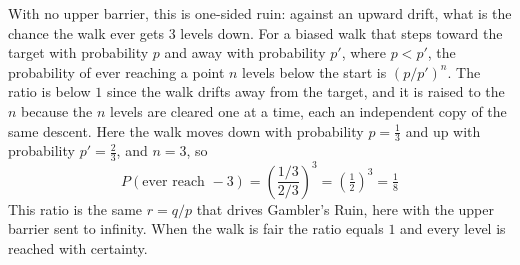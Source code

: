 \begin{solution}
With no upper barrier, this is one-sided ruin: against an upward drift, what is the chance the walk ever gets $3$ levels down. For a biased walk that steps toward the target with probability $p$ and away with probability $p'$, where $p < p'$, the probability of ever reaching a point $n$ levels below the start is $\left(p/p'\right)^n$. The ratio is below $1$ since the walk drifts away from the target, and it is raised to the $n$ because the $n$ levels are cleared one at a time, each an independent copy of the same descent. Here the walk moves down with probability $p = \tfrac{1}{3}$ and up with probability $p' = \tfrac{2}{3}$, and $n = 3$, so
\[
P(\text{ever reach } -3) = \left(\frac{1/3}{2/3}\right)^3 = \left(\tfrac{1}{2}\right)^3 = \tfrac{1}{8}
\]
This ratio is the same $r = q/p$ that drives Gambler's Ruin, here with the upper barrier sent to infinity. When the walk is fair the ratio equals $1$ and every level is reached with certainty.
\end{solution}
